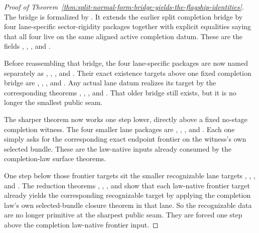 \begin{proof}[Proof of Theorem~\ref{thm:split-normal-form-bridge-yields-the-flagship-identities}]
\label{proof:thm:split-normal-form-bridge-yields-the-flagship-identities}
The bridge is formalized by . It extends
the earlier split completion bridge by four lane-specific sector-rigidity
packages together with explicit equalities saying that all four live on the
same aligned active completion datum. These are the fields
,
,
, and
.

Before reassembling that bridge, the four lane-specific packages are now named
separately as
,
,
, and
. Their exact existence targets
above one fixed completion bridge are
,
,
, and
. Any actual lane datum realizes
its target by the corresponding theorems
,
,
, and
. That older bridge still
exists, but it is no longer the smallest public seam.

The sharper theorem now works one step lower, directly above a fixed
no-stage completion witness. The four smaller lane packages are
,
,
, and
. Each one simply asks for the
corresponding exact endpoint frontier on the witness's own selected bundle.
These are the law-native inputs already consumed by the completion-law
surface theorems.

One step below those frontier targets sit the smaller recognizable lane
targets
,
,
, and
. The reduction theorems
,
,
,
and
show that each law-native frontier target already yields the corresponding
recognizable target by applying the completion law's own selected-bundle
closure theorem in that lane. So the recognizable data are no longer primitive
at the sharpest public seam. They are forced one step above the completion
law-native frontier input.


\end{proof}
